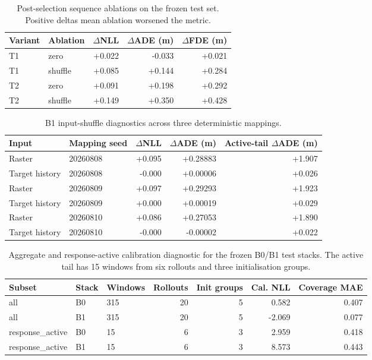 \begin{table}[h]
\centering\small
\caption{Post-selection sequence ablations on the frozen test set. Positive deltas mean ablation worsened the metric.}
\label{tab:app-sequence-ablation}
\begin{tabular}{@{}llrrr@{}}
\toprule
Variant & Ablation & $\Delta$NLL & $\Delta$ADE (m) & $\Delta$FDE (m) \\
\midrule
T1 & zero & +0.022 & -0.033 & +0.021 \\
T1 & shuffle & +0.085 & +0.144 & +0.284 \\
T2 & zero & +0.091 & +0.198 & +0.292 \\
T2 & shuffle & +0.149 & +0.350 & +0.428 \\
\bottomrule
\end{tabular}
\end{table}

\begin{table}[h]
\centering\small
\caption{B1 input-shuffle diagnostics across three deterministic mappings.}
\label{tab:app-b1-inputs}
\begin{tabular}{@{}llrrr@{}}
\toprule
Input & Mapping seed & $\Delta$NLL & $\Delta$ADE (m) & Active-tail $\Delta$ADE (m) \\
\midrule
Raster & 20260808 & +0.095 & +0.28883 & +1.907 \\
Target history & 20260808 & -0.000 & +0.00006 & +0.026 \\
Raster & 20260809 & +0.097 & +0.29293 & +1.923 \\
Target history & 20260809 & +0.000 & +0.00019 & +0.029 \\
Raster & 20260810 & +0.086 & +0.27053 & +1.890 \\
Target history & 20260810 & -0.000 & -0.00002 & +0.022 \\
\bottomrule
\end{tabular}
\end{table}

\begin{table}[h]
\centering\small
\caption{Aggregate and response-active calibration diagnostic for the frozen B0/B1 test stacks. The active tail has 15 windows from six rollouts and three initialisation groups.}
\label{tab:app-calibration-tail}
\begin{tabular}{@{}lllrrrr@{}}
\toprule
Subset & Stack & Windows & Rollouts & Init groups & Cal. NLL & Coverage MAE \\
\midrule
all & B0 & 315 & 20 & 5 & 0.582 & 0.407 \\
all & B1 & 315 & 20 & 5 & -2.069 & 0.077 \\
response\_active & B0 & 15 & 6 & 3 & 2.959 & 0.418 \\
response\_active & B1 & 15 & 6 & 3 & 8.573 & 0.443 \\
\bottomrule
\end{tabular}
\end{table}
